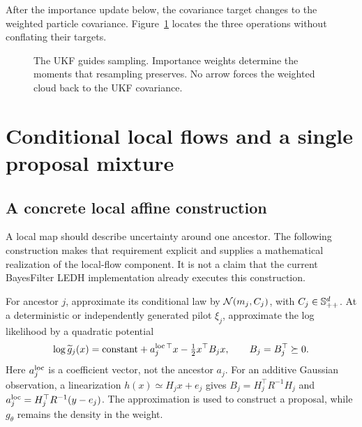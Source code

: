 After the importance update below, the covariance target changes to the
weighted particle covariance. Figure~\ref{fig:bf-covariance-proposal-covariance-roles} locates
the three operations without conflating their targets.
\begin{figure}[htbp]
\centering
{}
\caption{The UKF guides sampling. Importance weights determine the moments
that resampling preserves. No arrow forces the weighted cloud back to
the UKF covariance.}
\label{fig:bf-covariance-proposal-covariance-roles}
\end{figure}

\section{Conditional local flows and a single proposal mixture}

\subsection{A concrete local affine construction}

A local map should describe uncertainty around one ancestor. The following
construction makes that requirement explicit and supplies a mathematical
realization of the local-flow component. It is not a claim that the current
BayesFilter LEDH implementation already executes this construction.

For ancestor \(j\), approximate its conditional law by
\(\mathcal N(m_j,C_j)\), with \(C_j\in\mathbb S_{++}^d\).
At a deterministic or independently generated pilot \(\xi_j\), approximate
the log likelihood by a quadratic potential
\begin{equation}
\label{eq:bf-covariance-proposal-quadratic-guide}
 \log \widetilde g_j(x)
 =\mathrm{constant}+a_j^{\rm loc\,\top}x-\tfrac12x^\top B_jx,
 \qquad B_j=B_j^\top\succeq0 .
\end{equation}
Here \(a_j^{\rm loc}\) is a coefficient vector, not the ancestor \(a_j\).
For an additive Gaussian observation, a linearization
\(h(x)\simeq H_jx+e_j\) gives
\(B_j=H_j^\top R^{-1}H_j\) and
\(a_j^{\rm loc}=H_j^\top R^{-1}(y-e_j)\).
The approximation is used to construct a proposal, while \(g_\theta\)
remains the density in the weight.

